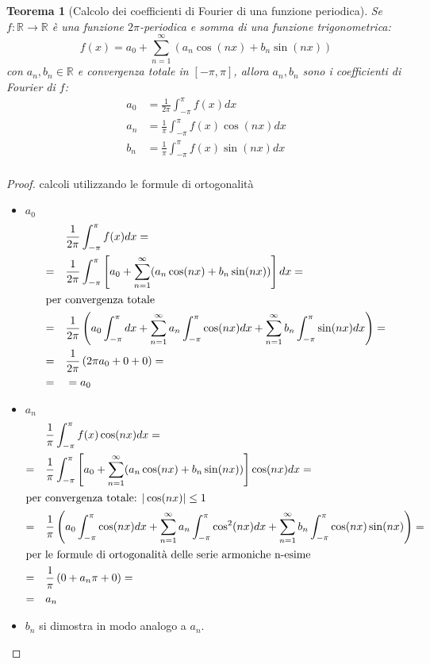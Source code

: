 \documentclass[12pt, a4paper]{article}
\theoremstyle{break}
\newtheorem{theorem}{Teorema} %
\begin{document}
\newpage
\begin{theorem} [Calcolo dei coefficienti di Fourier di una funzione periodica]
	Se $f: \mathbb{R} \to \mathbb{R}$ è una funzione $2\pi$-periodica e
	somma di una funzione trigonometrica:
	\[
		f(x) = a_0 + \sum_{n=1}^{\infty} (a_n \cos(nx) + b_n \sin(nx))
	\]
	con $a_n, b_n \in \mathbb{R}$ e convergenza totale in $[-\pi,\pi]$,
	allora $a_n, b_n$ sono i coefficienti di Fourier di $f$:
	\begin{align*}
		a_0 & = \frac{1}{2\pi} \int_{-\pi}^{\pi} f(x) dx         \\
		a_n & = \frac{1}{\pi} \int_{-\pi}^{\pi} f(x) \cos(nx) dx \\
		b_n & = \frac{1}{\pi} \int_{-\pi}^{\pi} f(x) \sin(nx) dx \\
	\end{align*}
\end{theorem}
\begin{proof} calcoli utilizzando le formule di ortogonalità
	\begin{itemize}
		\item $a_0$
			\begin{align*}
				 & \frac{1}{2\pi} \int_{-\pi}^{\pi} f(x) dx =                  \\
				= \quad & \frac{1}{2\pi} \int_{-\pi}^{\pi} \left[a_0 +
				\sum_{n=1}^{\infty} (a_n \cos(nx) + b_n \sin(nx))\right] dx  = \\
				\intertext{per convergenza totale}
				 = \quad & \frac{1}{2\pi} \left( a_0 \int_{-\pi}^{\pi} dx +
				\sum_{n=1}^{\infty} a_n \int_{-\pi}^{\pi} \cos(nx) dx +
				\sum_{n=1}^{\infty} b_n \int_{-\pi}^{\pi} \sin(nx) dx \right)
				=                                                              \\
				 = \quad & \frac{1}{2\pi} \left( 2\pi a_0 + 0 + 0 \right)   =        \\
				 = \quad & = a_0
			\end{align*}
		\item $a_n$
			\begin{align*}
				 & \frac{1}{\pi} \int_{-\pi}^{\pi} f(x) \cos(nx) dx =         \\
				 = \quad & \frac{1}{\pi} \int_{-\pi}^{\pi} \left[a_0 +
				\sum_{n=1}^{\infty} (a_n \cos(nx) + b_n \sin(nx))\right] \cos(nx)
				dx =                                                          \\
				\intertext{per convergenza totale: $| \cos(nx) | \leq 1$ }
				 = \quad & \frac{1}{\pi} \left( a_0 \int_{-\pi}^{\pi} \cos(nx) dx +
				\sum_{n=1}^{\infty} a_n \int_{-\pi}^{\pi} \cos^2(nx) dx +
				\sum_{n=1}^{\infty} b_n \int_{-\pi}^{\pi} \cos(nx) \sin(nx)
				\right)                                                 =     \\
				\intertext{per le formule di ortogonalità delle serie armoniche
				n-esime}
				 = \quad & \frac{1}{\pi} \left( 0 + a_n \pi + 0 \right)  =          \\
				 = \quad & a_n
			\end{align*}
		\item $b_n$ si dimostra in modo analogo a $a_n$.
	\end{itemize}
\end{proof}
\end{document}
